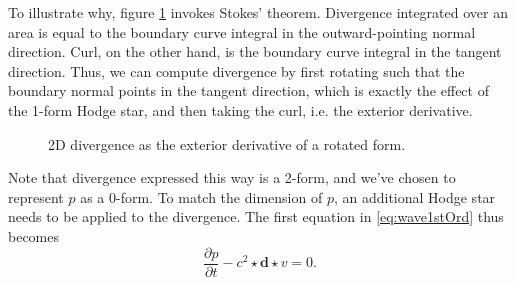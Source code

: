 \documentclass[utf8,english]{gradu3}
\begin{document}
To illustrate why, figure \ref{fig:2d_divergence} invokes Stokes' theorem.
Divergence integrated over an area is equal to the boundary curve integral
in the outward-pointing normal direction.
Curl, on the other hand, is the boundary curve integral in the tangent direction.
Thus, we can compute divergence by first rotating such that the boundary normal
points in the tangent direction, which is exactly the effect of the 1-form Hodge star,
and then taking the curl, i.e. the exterior derivative.

\begin{figure}[h]
  \centering
  \caption{2D divergence as the exterior derivative of a rotated form.}
  \label{fig:2d_divergence}
\end{figure}

Note that divergence expressed this way is a 2-form,
and we've chosen to represent $p$ as a 0-form.
To match the dimension of $p$, an additional Hodge star
needs to be applied to the divergence.
The first equation in \ref{eq:wave1stOrd} thus becomes
\begin{equation}\label{eq:intermediate_eq_1}
  \frac{\partial p}{\partial t} - c^2 \star \mathbf{d} \star v = 0.
\end{equation}
\end{document}
